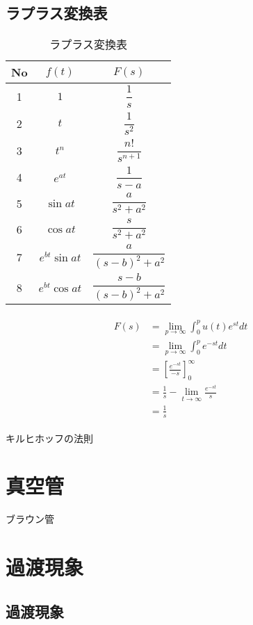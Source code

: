 \section{ラプラス変換表}
\begin{table}[htbp]
\begin{center}
\caption{ラプラス変換表}
\begin{tabular}{|c|c|c|}
\hline 
 No &  $f(t)$	& $F(s)$ \\ \hline
1& $1$		& $\dfrac{1}{s}$  \\[1.5ex]
2& $t	$	& $\dfrac{1}{s^{2}}$  \\[1.5ex]
3& $t^{n}$		& $\dfrac{n!}{s^{n+1}}$  \\[1.5ex]
4& $e^{at}$		& $\dfrac{1}{s-a}$  \\[1.5ex]
5& $\sin{at}$		& $\dfrac{a}{s^{2}+a^{2}}$  \\[1.5ex]
6& $\cos{at}$		& $\dfrac{s}{s^{2}+a^{2}}$  \\[1.5ex]
7& $e^{bt}\sin{at}$		& $\dfrac{a}{(s-b)^{2}+a^{2}}$  \\[1.5ex]
8& $e^{bt}\cos{at}$		& $\dfrac{s-b}{(s-b)^{2}+a^{2}}$  \\[1.5ex]
\hline
\end{tabular}
\end{center}
\end{table}
\begin{Proof}
\begin{align}
\begin{split}
F(s) &= \lim_{p \to \infty} \int_{0}^{p} u (t) e^{st} dt\\
&=\lim_{p \to \infty} \int_{0}^{p} e^{-st}dt\\
&=\left[ \frac{e^{-st}}{-s} \right]^{\infty}_{0}\\
&=\frac{1}{s}-\lim_{t \to \infty} \frac{e^{-st}}{s}\\
&=\frac{1}{s}
\end{split}
\end{align}
\end{Proof}

キルヒホッフの法則

\chapter{真空管}
ブラウン管
\chapter{過渡現象}
\section{過渡現象}

